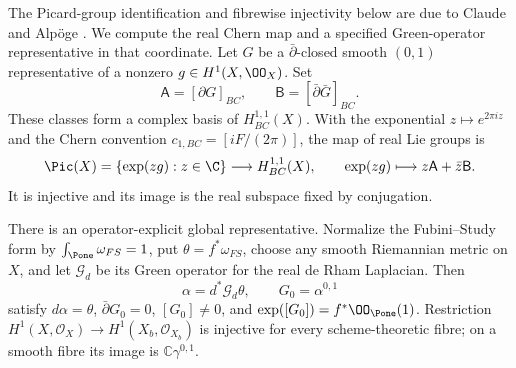 \begin{proposition}\label{inv:C3.1}\label{wb:cor:picard-line-audit}
The Picard-group identification and fibrewise injectivity below are due to Claude and Alp\"oge \cite[Theorem~10.5(b), proof Steps~1 and~4, p.~88]{AC2026}. We compute the real Chern map and a specified Green-operator representative in that coordinate. Let $G$ be a $\bar\partial$-closed smooth $(0,1)$ representative of
a nonzero $g\in H^1(X,\OO_X)$.  Set
\[
\mathsf A=[\partial G]_{BC},\qquad
\mathsf B=[\bar\partial\bar G]_{BC}.
\]
These classes form a complex basis of $H^{1,1}_{BC}(X)$.
With the exponential $z\mapsto e^{2\pi iz}$ and the Chern convention
$c_{1,BC}=[iF/(2\pi)]$, the map of real Lie groups is
\begin{equation}\label{inv:eq:C-Pic-map}
\Pic(X)=\{\exp(zg):z\in\C\}\longrightarrow H^{1,1}_{BC}(X),
\qquad \exp(zg)\longmapsto z\mathsf A+\bar z\mathsf B.
\end{equation}
It is injective and its image is the real subspace fixed by conjugation.

There is an operator-explicit global representative.  Normalize the
Fubini--Study form by $\int_{\Pone}\omega_{FS}=1$, put
$\theta=f^*\omega_{FS}$, choose any smooth Riemannian metric on $X$,
and let $\mathcal G_d$ be its Green operator for the real de Rham
Laplacian.  Then
\begin{equation}\label{inv:eq:C-G-Green}
\alpha=d^*\mathcal G_d\theta,\qquad G_0=\alpha^{0,1}
\end{equation}
satisfy $d\alpha=\theta$, $\bar\partial G_0=0$,
$[G_0]\ne0$, and $\exp([G_0])=f^*\OO_{\Pone}(1)$.
Restriction $H^1(X,\mathcal O_X)\to H^1(X_b,\mathcal O_{X_b})$ is injective for every scheme-theoretic fibre; on a smooth fibre its image is $\mathbb C\gamma^{0,1}$.
\end{proposition}
